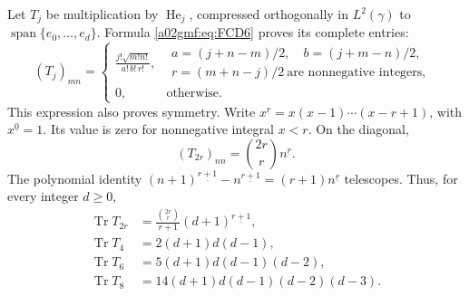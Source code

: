 \documentclass[11pt,a4paper]{article}
\begin{document}
Let \(T_j\) be multiplication by \(\operatorname{He}_j\), compressed
orthogonally in \(L^2(\gamma)\) to
\(\operatorname{span}\{e_0,\ldots,e_d\}\). Formula \eqref{a02gmf:eq:FCD6}
proves its complete entries:
\begin{equation}
 (T_j)_{mn}=
 \begin{cases}
 \displaystyle
 \frac{j!\sqrt{m!n!}}{a!\,b!\,r!},
 &
\begin{gathered}
 a=(j+n-m)/2,\quad b=(j+m-n)/2,\\ r=(m+n-j)/2
       \ \text{are nonnegative integers},
\end{gathered}\\[4pt]
 0,&\text{otherwise}.
 \end{cases}
 \tag{FCD7}\label{a02gmf:eq:FCD7}
\end{equation}
This expression also proves symmetry. Write
\(x^{\underline r}=x(x-1)\cdots(x-r+1)\), with
\(x^{\underline0}=1\). Its value is zero for nonnegative integral
\(x<r\). On the diagonal,
\[
 (T_{2r})_{nn}=\binom{2r}{r}n^{\underline r}.
\]
The polynomial identity
\((n+1)^{\underline{r+1}}-n^{\underline{r+1}}
 =(r+1)n^{\underline r}\)
telescopes. Thus, for every integer \(d\ge0\),
\begin{equation}
\begin{aligned}
 \operatorname{Tr}T_{2r}
    &=\frac{\binom{2r}{r}}{r+1}(d+1)^{\underline{r+1}},\\
 \operatorname{Tr}T_4&=2(d+1)d(d-1),\\
 \operatorname{Tr}T_6&=5(d+1)d(d-1)(d-2),\\
 \operatorname{Tr}T_8&=14(d+1)d(d-1)(d-2)(d-3).
\end{aligned}
 \tag{FCD8}\label{a02gmf:eq:FCD8}
\end{equation}
\end{document}
